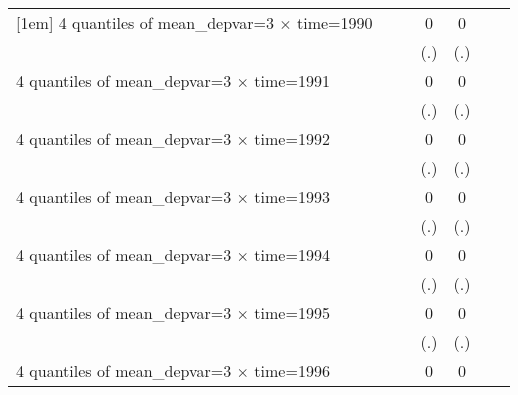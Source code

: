 \begin{table}[htbp]
\begin{tabular}{l*{6}{c}}
[1em]
4 quantiles of mean\_depvar=3 $\times$ time=1990&                     &                     &           0         &           0         &                     &                     \\
                    &                     &                     &         (.)         &         (.)         &                     &                     \\
[1em]
4 quantiles of mean\_depvar=3 $\times$ time=1991&                     &                     &           0         &           0         &                     &                     \\
                    &                     &                     &         (.)         &         (.)         &                     &                     \\
[1em]
4 quantiles of mean\_depvar=3 $\times$ time=1992&                     &                     &           0         &           0         &                     &                     \\
                    &                     &                     &         (.)         &         (.)         &                     &                     \\
[1em]
4 quantiles of mean\_depvar=3 $\times$ time=1993&                     &                     &           0         &           0         &                     &                     \\
                    &                     &                     &         (.)         &         (.)         &                     &                     \\
[1em]
4 quantiles of mean\_depvar=3 $\times$ time=1994&                     &                     &           0         &           0         &                     &                     \\
                    &                     &                     &         (.)         &         (.)         &                     &                     \\
[1em]
4 quantiles of mean\_depvar=3 $\times$ time=1995&                     &                     &           0         &           0         &                     &                     \\
                    &                     &                     &         (.)         &         (.)         &                     &                     \\
[1em]
4 quantiles of mean\_depvar=3 $\times$ time=1996&                     &                     &           0         &           0         &                     &                     \\

\end{tabular}
\end{table}
